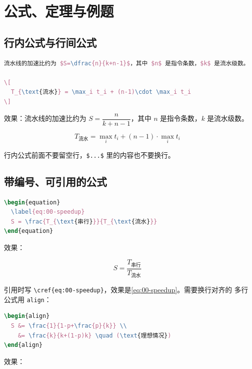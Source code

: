 \section{公式、定理与例题}
\label{sec:00-math}

\subsection{行内公式与行间公式}

\begin{lstlisting}[language=TeX]
流水线的加速比约为 $S=\dfrac{n}{k+n-1}$，其中 $n$ 是指令条数，$k$ 是流水级数。

\[
  T_{\text{流水}} = \max_i t_i + (n-1)\cdot \max_i t_i
\]
\end{lstlisting}

效果：流水线的加速比约为 $S=\dfrac{n}{k+n-1}$，其中 $n$ 是指令条数，$k$ 是流水级数。

\[
  T_{\text{流水}} = \max_i t_i + (n-1)\cdot \max_i t_i
\]

行内公式前面不要留空行，\verb|$...$| 里的内容也不要换行。

\subsection{带编号、可引用的公式}

\begin{lstlisting}[language=TeX]
\begin{equation}
  \label{eq:00-speedup}
  S = \frac{T_{\text{串行}}}{T_{\text{流水}}}
\end{equation}
\end{lstlisting}

效果：

\begin{equation}
  \label{eq:00-speedup}
  S = \frac{T_{\text{串行}}}{T_{\text{流水}}}
\end{equation}

引用时写 \verb|\cref{eq:00-speedup}|，效果是\cref{eq:00-speedup}。需要换行对齐的
多行公式用 \texttt{align}：

\begin{lstlisting}[language=TeX]
\begin{align}
  S &= \frac{1}{1-p+\frac{p}{k}} \\
    &= \frac{k}{k+(1-p)k} \quad (\text{理想情况})
\end{align}
\end{lstlisting}

效果：


